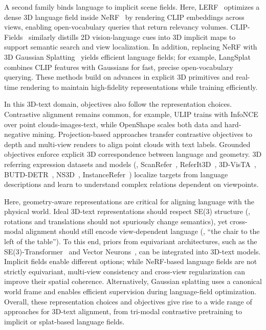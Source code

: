 A second family binds language to implicit scene fields. Here, LERF~\cite{kerr2023lerf} optimizes a dense 3D language field inside NeRF~\cite{mildenhall2021nerf} by rendering CLIP embeddings across views, enabling open-vocabulary queries that return relevancy volumes. 
CLIP-Fields~\cite{shafiullah2022clip} similarly distills 2D vision-language cues into 3D implicit maps to support semantic search and view localization. 
In addition, replacing NeRF with 3D Gaussian Splatting~\cite{kerbl20233d} yields efficient language fields; for example, LangSplat~\cite{qin2024langsplat} combines CLIP features with Gaussians for fast, precise open-vocabulary querying. 
These methods build on advances in explicit 3D primitives and real-time rendering to maintain high-fidelity representations while training efficiently.

In this 3D-text domain, objectives also follow the representation choices. Contrastive alignment remains common, for example, ULIP trains with InfoNCE~\cite{oord2018representation} over point clouds-images-text, while OpenShape scales both data and hard-negative mining. 
Projection-based approaches transfer contrastive objectives to depth and multi-view renders to align point clouds with text labels. 
Grounded objectives enforce explicit 3D correspondence between language and geometry. 
3D referring expression datasets and models (\eg, ScanRefer~\cite{chen2020scanrefer}, ReferIt3D~\cite{achlioptas2020referit3d}, 3D-VisTA~\cite{zhu20233d}, BUTD-DETR~\cite{jain2022bottom}, NS3D~\cite{hsu2023ns3d}, InstanceRefer~\cite{yuan2021instancerefer}) localize targets from language descriptions and learn to understand complex relations dependent on viewpoints.

Here, geometry-aware representations are critical for aligning language with the physical world. 
Ideal 3D-text representations should respect SE(3) structure (\eg, rotations and translations should not spuriously change semantics), yet cross-modal alignment should still encode view-dependent language (\eg, ``the chair to the left of the table''). 
To this end, priors from equivariant architectures, such as the SE(3)-Transformer~\cite{fuchs2020se} and Vector Neurons~\cite{deng2021vector}, can be integrated into 3D-text models. 
Implicit fields enable different options; while NeRF-based language fields are not strictly equivariant, multi-view consistency and cross-view regularization can improve their spatial coherence. 
Alternatively, Gaussian splatting uses a canonical world frame and enables efficient supervision during language-field optimization. 
Overall, these representation choices and objectives give rise to a wide range of approaches for 3D-text alignment, from tri-modal contrastive pretraining to implicit or splat-based language fields.

